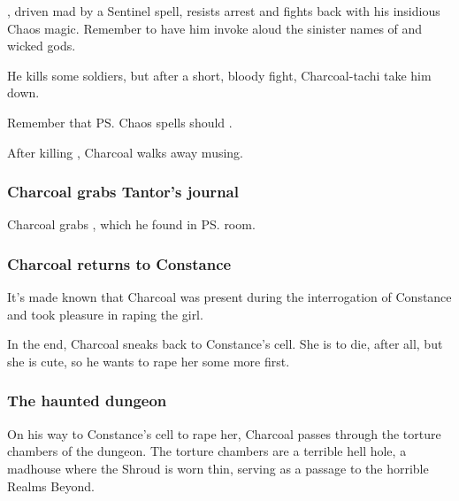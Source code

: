 \Anatoli, driven mad by a Sentinel spell, resists arrest and fights back with his insidious Chaos magic. Remember to have him invoke aloud the sinister names of \daemons{} and wicked gods. 

He kills some soldiers, but after a short, bloody fight, Charcoal-tachi take him down. 

Remember that \ps{\Onatol} Chaos spells should . 

After killing \Anatoli{}, Charcoal walks away musing. 





\subsubsection{Charcoal grabs Tantor's journal}
Charcoal grabs , which he found in \ps{\Onatol} room.





\subsubsection{Charcoal returns to Constance}
It's made known that Charcoal was present during the interrogation of Constance and took pleasure in raping the girl. 

In the end, Charcoal sneaks back to Constance's cell. She is to die, after all, but she is cute, so he wants to rape her some more first. 






\subsubsection{The haunted dungeon}
On his way to Constance's cell to rape her, Charcoal passes through the torture chambers of the dungeon. The torture chambers are a terrible hell hole, a madhouse where the Shroud is worn thin, serving as a passage to the horrible Realms Beyond. 

